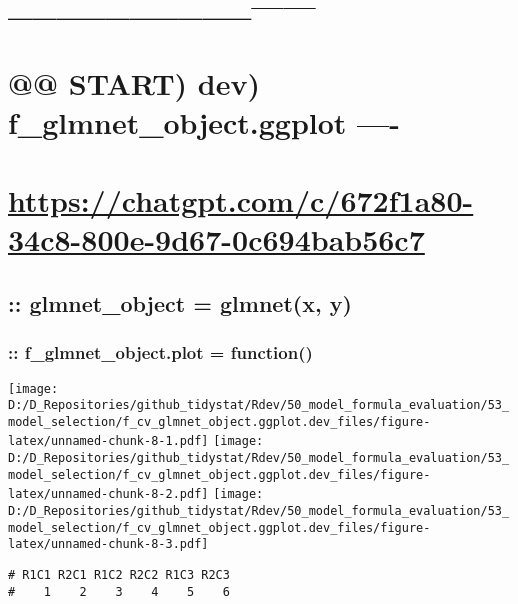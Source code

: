 \documentclass[
]{article}
\begin{document}
\hypertarget{section-2}{%
\section{\_\_\_\_\_\_\_\_\_\_\textbar------}\label{section-2}}

\hypertarget{start-dev-f_glmnet_object.ggplot--}{%
\section{@@ START) dev) f\_glmnet\_object.ggplot
----}\label{start-dev-f_glmnet_object.ggplot--}}

\hypertarget{httpschatgpt.comc672f1a80-34c8-800e-9d67-0c694bab56c7}{%
\section{\texorpdfstring{\url{https://chatgpt.com/c/672f1a80-34c8-800e-9d67-0c694bab56c7}}{https://chatgpt.com/c/672f1a80-34c8-800e-9d67-0c694bab56c7}}\label{httpschatgpt.comc672f1a80-34c8-800e-9d67-0c694bab56c7}}

\hypertarget{glmnet_object-glmnetx-y}{%
\subsection{:: glmnet\_object = glmnet(x,
y)}\label{glmnet_object-glmnetx-y}}

\hypertarget{f_glmnet_object.plot-function}{%
\subsubsection{:: f\_glmnet\_object.plot =
function()}\label{f_glmnet_object.plot-function}}

\texttt{[image: D:/D\_Repositories/github\_tidystat/Rdev/50\_model\_formula\_evaluation/53\_model\_selection/f\_cv\_glmnet\_object.ggplot.dev\_files/figure-latex/unnamed-chunk-8-1.pdf]}
\texttt{[image: D:/D\_Repositories/github\_tidystat/Rdev/50\_model\_formula\_evaluation/53\_model\_selection/f\_cv\_glmnet\_object.ggplot.dev\_files/figure-latex/unnamed-chunk-8-2.pdf]}
\texttt{[image: D:/D\_Repositories/github\_tidystat/Rdev/50\_model\_formula\_evaluation/53\_model\_selection/f\_cv\_glmnet\_object.ggplot.dev\_files/figure-latex/unnamed-chunk-8-3.pdf]}

\begin{verbatim}
# R1C1 R2C1 R1C2 R2C2 R1C3 R2C3 
#    1    2    3    4    5    6
\end{verbatim}
\end{document}
